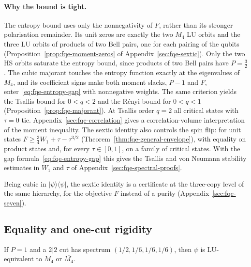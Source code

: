 \paragraph{Why the bound is tight.} The entropy bound uses only the nonnegativity of $F$, rather than its stronger polarisation remainder. Its unit zeros are exactly the two
$M_4$ LU orbits and the three LU orbits of products of two Bell pairs, one for each pairing of the qubits
(Proposition~\ref{prop:fqe-moment-zeros} of Appendix~\ref{sec:fqe-sextic}). Only the two HS orbits saturate the entropy bound,
since products of two Bell pairs have $P=\tfrac32$. The cubic majorant touches the entropy function exactly at the eigenvalues of $M_4$, and
its coefficient signs make both moment slacks, $P-1$ and $F$, enter~\eqref{eq:fqe-entropy-gap} with nonnegative
weights. The same criterion yields the Tsallis bound for $0<q<2$ and the R\'enyi bound for $0<q<1$
(Proposition~\ref{prop:fqe-majorant}). At Tsallis order $q=2$ all critical states with $\tau=0$ tie.
Appendix~\ref{sec:fqe-correlation} gives a correlation-volume interpretation of the moment inequality. The sextic identity also
controls the spin flip: for unit states $F\ge\frac34W_1+\tau-\tau^{3/2}$ (Theorem~\ref{thm:fqe-general-envelope}), with equality on
product states and, for every $\tau\in[0,1]$, on a family of critical states. With the gap formula~\eqref{eq:fqe-entropy-gap}
this gives the Tsallis and von Neumann stability estimates in $W_1$ and $\tau$ of Appendix~\ref{sec:fqe-spectral-proofs}.

Being cubic in $|\psi\rangle\langle\psi|$, the sextic identity is a certificate at the three-copy level of the same
hierarchy, for the objective $F$ instead of a purity (Appendix~\ref{sec:fqe-seven}).

\subsection{Equality and one-cut rigidity}\label{sec:fqe-entropy_maximum-equality-and-one-cut-rigidity}

\begin{proposition}\label{prop:fqe-onecut} If $P=1$ and a $2|2$ cut has spectrum
$(1/2,1/6,1/6,1/6)$, then $\psi$ is LU-equivalent to $M_4$ or $\overline{M_4}$.

\end{proposition}

